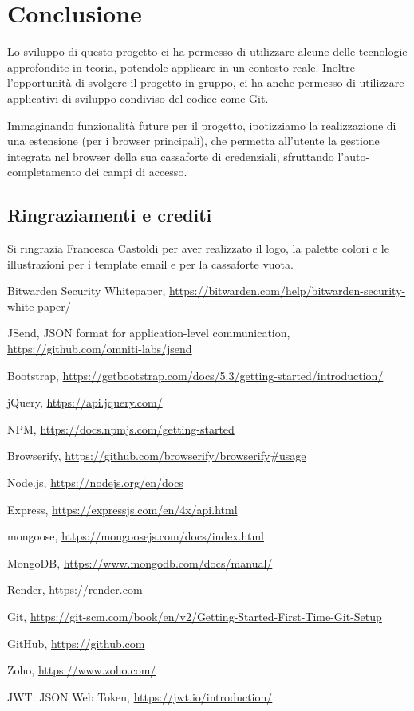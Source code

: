 \documentclass[a4paper]{report}
\begin{document}
\chapter{Conclusione}
Lo sviluppo di questo progetto ci ha permesso di utilizzare alcune delle tecnologie approfondite in teoria, potendole applicare in un contesto reale. Inoltre l'opportunità di svolgere il progetto in gruppo, ci ha anche permesso di utilizzare applicativi di sviluppo condiviso del codice come Git.

Immaginando funzionalità future per il progetto, ipotizziamo la realizzazione di una estensione (per i browser principali), che permetta all'utente la gestione integrata nel browser della sua cassaforte di credenziali, sfruttando l'auto-completamento dei campi di accesso.

\section{Ringraziamenti e crediti}
Si ringrazia Francesca Castoldi per aver realizzato il logo, la palette colori e le illustrazioni per i template email e per la cassaforte vuota. %




\begin{thebibliography}{99}
Bitwarden Security Whitepaper, \url{https://bitwarden.com/help/bitwarden-security-white-paper/}

JSend, JSON format for application-level communication, \url{https://github.com/omniti-labs/jsend}

Bootstrap, \url{https://getbootstrap.com/docs/5.3/getting-started/introduction/}

jQuery, \url{https://api.jquery.com/}

NPM, \url{https://docs.npmjs.com/getting-started}

Browserify, \url{https://github.com/browserify/browserify#usage}

Node.js, \url{https://nodejs.org/en/docs}

Express, \url{https://expressjs.com/en/4x/api.html}

mongoose, \url{https://mongoosejs.com/docs/index.html}

MongoDB, \url{https://www.mongodb.com/docs/manual/}

Render, \url{https://render.com}

Git, \url{https://git-scm.com/book/en/v2/Getting-Started-First-Time-Git-Setup}

GitHub, \url{https://github.com}

Zoho, \url{https://www.zoho.com/}

JWT: JSON Web Token, \url{https://jwt.io/introduction/}



\end{thebibliography}
\end{document}
